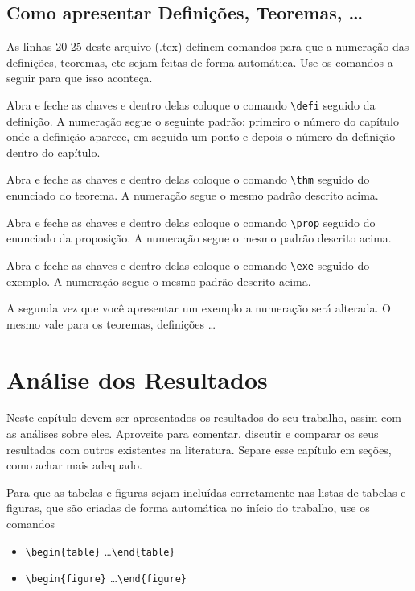 \documentclass[12pt,a4paper,header]{abnt}
\begin{document}
\section{Como apresentar Definições, Teoremas, \ldots}

As linhas 20-25 deste arquivo (.tex) definem comandos para que a numeração das definições, teoremas, etc sejam feitas de forma automática. Use os comandos a seguir para que isso aconteça. 

{
Abra e feche as chaves e dentro delas coloque o comando \verb|\defi| seguido da definição. A numeração segue o seguinte padrão: primeiro o número do capítulo onde a definição aparece, em seguida um ponto e depois o número da definição dentro do capítulo.
}

{\thm
Abra e feche as chaves e dentro delas coloque o comando \verb|\thm| seguido do enunciado do teorema. A numeração segue o mesmo padrão descrito acima. 
}

{\prop
Abra e feche as chaves e dentro delas coloque o comando \verb|\prop| seguido do enunciado da proposição. A numeração segue o mesmo padrão descrito acima. 
}


{\exe
Abra e feche as chaves e dentro delas coloque o comando \verb|\exe| seguido do exemplo. A numeração segue o mesmo padrão descrito acima. 
}

{\exe
A segunda vez que você apresentar um exemplo a numeração será alterada. O mesmo vale para os teoremas, definições \ldots
}



\chapter{Análise dos Resultados}

Neste capítulo devem ser apresentados os resultados do seu trabalho, assim com as análises sobre eles. Aproveite para comentar, discutir e comparar os seus resultados com outros existentes na literatura. Separe esse capítulo em seções, como achar mais adequado. 

Para que as tabelas e figuras sejam incluídas corretamente nas listas de tabelas e figuras, que são criadas de forma automática no início do trabalho, use os comandos 
\begin{itemize}
\item \verb|\begin{table}| \ldots \verb|\end{table}| 
\item \verb|\begin{figure}| \ldots \verb|\end{figure}|
\end{itemize} 
\end{document}
